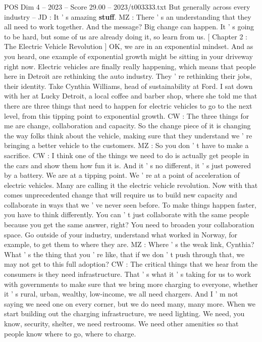 \begin{textsample}{POS Dim 4 – 2023 – Score 29.00 – 2023/t003333.txt}
But generally across every industry -- JD : It ' s amazing \textbf{stuff}.
MZ : There ' s an understanding that they all need to work together.
And the message?
Big change can happen.
It ' s going to be hard, but some of us are already doing it, so learn from us. [ Chapter 2 : The Electric Vehicle Revolution ] OK, we are in an exponential mindset.
And as you heard, one example of exponential growth might be sitting in your driveway right now.
Electric vehicles are finally really happening, which means that people here in Detroit are rethinking the auto industry.
They ' re rethinking their jobs, their identity.
Take Cynthia Williams, head of sustainability at Ford.
I sat down with her at Lucky Detroit, a local coffee and barber shop, where she told me that there are three things that need to happen for electric vehicles to go to the next level, from this tipping point to exponential growth.
CW : The three things for me are change, collaboration and capacity.
So the change piece of it is changing the way folks think about the vehicle, making sure that they understand we ' re bringing a better vehicle to the customers.
MZ : So you don ' t have to make a sacrifice.
CW : I think one of the things we need to do is actually get people in the cars and show them how fun it is.
And it ' s no different, it ' s just powered by a battery.
We are at a tipping point.
We ' re at a point of acceleration of electric vehicles.
Many are calling it the electric vehicle revolution.
Now with that comes unprecedented change that will require us to build new capacity and collaborate in ways that we ' ve never seen before.
To make things happen faster, you have to think differently.
You can ' t just collaborate with the same people because you get the same answer, right?
You need to broaden your collaboration space.
Go outside of your industry, understand what worked in Norway, for example, to get them to where they are.
MZ : Where ' s the weak link, Cynthia?
What ' s the thing that you ' re like, that if we don ' t push through that, we may not get to this full adoption?
CW : The critical things that we hear from the consumers is they need infrastructure.
That ' s what it ' s taking for us to work with governments to make sure that we bring more charging to everyone, whether it ' s rural, urban, wealthy, low-income, we all need chargers.
And I ' m not saying we need one on every corner, but we do need many, many more.
When we start building out the charging infrastructure, we need lighting.
We need, you know, security, shelter, we need restrooms.
We need other amenities so that people know where to go, where to charge.

\end{textsample}
